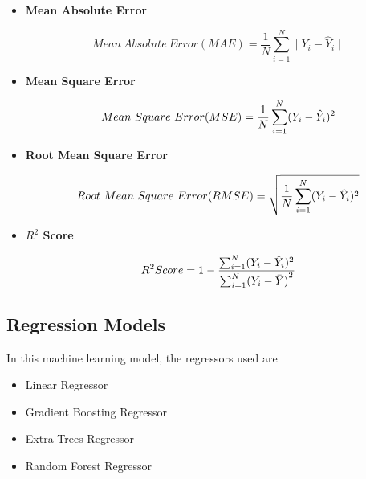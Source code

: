 \documentclass[12pt,letterpaper]{article}
\begin{document}
        \begin{itemize}
        
            \item\textbf{Mean Absolute Error}
            
                \[Mean\ Absolute\ Error(MAE) =  \frac{1}{N}\sum_{i=1}^{N}\mid Y_i - \hat Y_i\mid\]
                
            \item\textbf{Mean Square Error}
            
                \[Mean\ Square\ Error(MSE) =  \frac{1}{N}\sum_{i=1}^{N}(Y_i - \hat Y_i)\\^2\]
            
            \item\textbf{Root Mean Square Error}
            
                \[Root\ Mean\ Square\ Error(RMSE) =  \sqrt{\frac{1}{N}\sum_{i=1}^{N}(Y_i - \hat Y_i)\\^2}\]
                
                
            \item\textbf{$R^2$ Score}
            
                \[R^2 Score = 1 - \frac{\sum_{i=1}^{N}(Y_i - \hat Y_i)\\^2}{\sum_{i = 1}^{N}({Y_i - \bar{Y})}^2}\]
            
        \end{itemize}
        
    \subsection*{Regression Models}
    
        In this machine learning model, the regressors used are
        
        \begin{itemize}
        
            \item Linear Regressor
                
            \item Gradient Boosting Regressor
                
            \item Extra Trees Regressor
                
            \item Random Forest Regressor
                
        \end{itemize}
\end{document}
